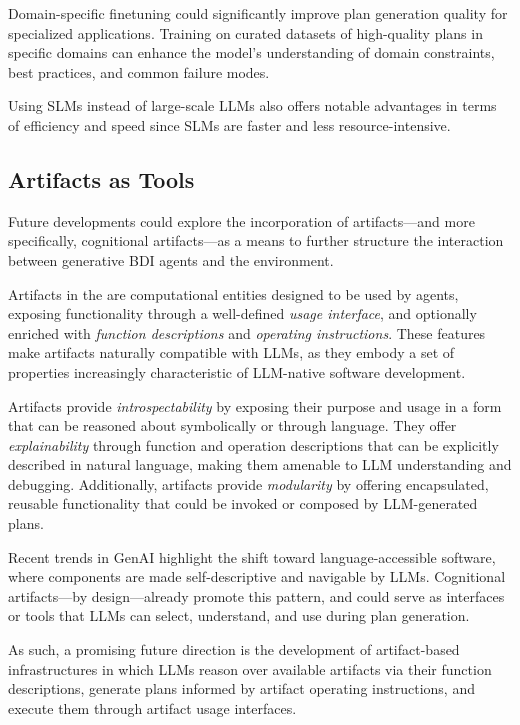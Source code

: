 \documentclass[12pt,a4paper,openright,twoside]{book}
\begin{document}
Domain-specific finetuning could significantly improve plan generation quality for specialized applications. 
%
Training on curated datasets of high-quality plans in specific domains can enhance the model's understanding of domain constraints, best practices, and common failure modes.

Using \acp{SLM} instead of large-scale \acp{LLM} also offers notable advantages in terms of efficiency and speed since \acp{SLM} are faster and less resource-intensive.

\subsection{Artifacts as Tools}\label{sec:artifacts}

Future developments could explore the incorporation of artifacts---and more specifically, cognitional artifacts---as a means to further structure the interaction between generative \ac{BDI} agents and the environment.

Artifacts in the \aaa{} are computational entities designed to be used by agents, exposing functionality through a well-defined \textit{usage interface}, and optionally enriched with \textit{function descriptions} and \textit{operating instructions}.
%
These features make artifacts naturally compatible with \acp{LLM}, as they embody a set of properties increasingly characteristic of \ac{LLM}-native software development.

Artifacts provide \textit{introspectability} by exposing their purpose and usage in a form that can be reasoned about symbolically or through language.
%
They offer \textit{explainability} through function and operation descriptions that can be explicitly described in natural language, making them amenable to \ac{LLM} understanding and debugging. 
%
Additionally, artifacts provide \textit{modularity} by offering encapsulated, reusable functionality that could be invoked or composed by \ac{LLM}-generated plans.

Recent trends in GenAI highlight the shift toward language-accessible software, where components are made self-descriptive and navigable by \acp{LLM}. 
%
Cognitional artifacts---by design---already promote this pattern, and could serve as interfaces or tools that \acp{LLM} can select, understand, and use during plan generation.

As such, a promising future direction is the development of artifact-based infrastructures in which \acp{LLM} reason over available artifacts via their function descriptions, generate plans informed by artifact operating instructions, and execute them through artifact usage interfaces.
\end{document}
